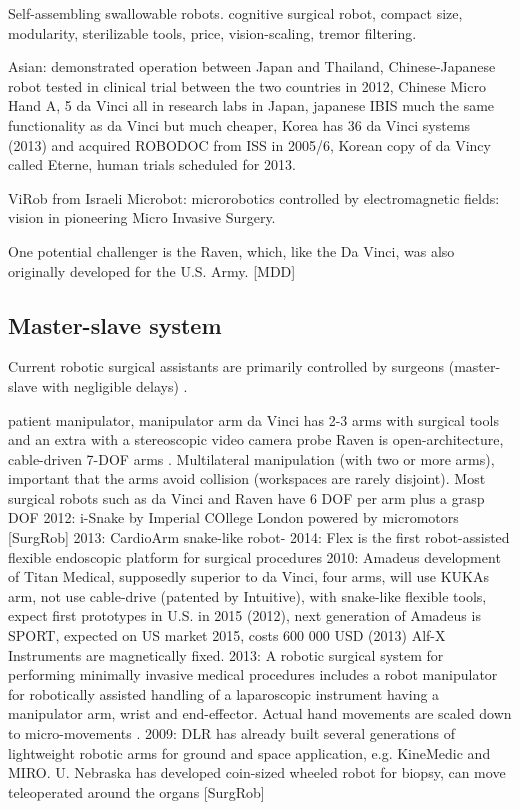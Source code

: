 Self-assembling swallowable robots.
cognitive surgical robot, compact size, modularity, sterilizable tools, price, vision-scaling, tremor filtering.

Asian: demonstrated operation between Japan and Thailand, Chinese-Japanese robot tested in clinical trial between the two countries in 2012, Chinese Micro Hand A, 5 da Vinci all in research labs in Japan, japanese IBIS much the same functionality as da Vinci but much cheaper, Korea has 36 da Vinci systems (2013) and acquired ROBODOC from ISS in 2005/6, Korean copy of da Vincy called Eterne, human trials scheduled for 2013.

ViRob from Israeli Microbot: microrobotics controlled by electromagnetic fields: vision in pioneering Micro Invasive Surgery.

One potential challenger is the Raven, which, like the Da Vinci, was also originally developed for the U.S. Army. [MDD]

\subsection{Master-slave system} 
Current robotic surgical assistants are primarily controlled by surgeons (master-slave with negligible delays) \citep{bib:raven_debride}.

patient manipulator, manipulator arm
da Vinci has 2-3 arms with surgical tools and an extra with a stereoscopic video camera probe
Raven is open-architecture, cable-driven 7-DOF arms \citep{bib:raven_debride}.
Multilateral manipulation (with two or more arms), important that the arms avoid collision \citep{bib:raven_debride} (workspaces are rarely disjoint).
Most surgical robots such as da Vinci and Raven have 6 DOF per arm plus a grasp DOF \citep{bib:raven_debride}
2012: i-Snake by Imperial COllege London powered by micromotors [SurgRob]
2013: CardioArm snake-like robot-
2014: Flex is the first robot-assisted flexible endoscopic platform for surgical procedures
2010: Amadeus development of Titan Medical, supposedly superior to da Vinci, four arms, will use KUKAs arm, not use cable-drive (patented by Intuitive), with snake-like flexible tools, expect first prototypes in U.S. in 2015 (2012), next generation of Amadeus is SPORT, expected on US market 2015, costs 600 000 USD (2013)
Alf-X Instruments are magnetically fixed.
2013: A robotic surgical system for performing minimally invasive medical procedures includes a robot manipulator for robotically assisted handling of a laparoscopic instrument having a manipulator arm, wrist and end-effector.
Actual hand movements are scaled down to micro-movements \citep{bib:intuitive_monopoly}.
2009: DLR has already built several generations of lightweight robotic arms for ground and space application, e.g. KineMedic and MIRO. U. Nebraska has developed coin-sized wheeled robot for biopsy, can move teleoperated around the organs [SurgRob]

